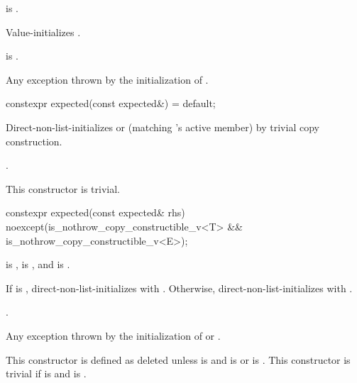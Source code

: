 \begin{itemdescr}
\pnum
\constraints
{} is .

\pnum
\effects
Value-initializes .

\pnum
\ensures
{} is .

\pnum
\throws
Any exception thrown by the initialization of .
\end{itemdescr}

%
\begin{itemdecl}
constexpr expected(const expected&) = default;
\end{itemdecl}

\begin{itemdescr}
\pnum
\effects
Direct-non-list-initializes  or  (matching 's active member) by trivial copy construction.

\pnum
\ensures
{}.

\pnum
\remarks
This constructor is trivial.
\end{itemdescr}

%
\begin{itemdecl}
constexpr expected(const expected& rhs) noexcept(is_nothrow_copy_constructible_v<T> &&
                                                 is_nothrow_copy_constructible_v<E>);
\end{itemdecl}

\begin{itemdescr}
\pnum
\constraints
{} is ,  is , and  is .

\pnum
\effects
If  is , direct-non-list-initializes  with . Otherwise, direct-non-list-initializes  with .

\pnum
\ensures
{}.

\pnum
\throws
Any exception thrown by the initialization of  or .

\pnum
\remarks
This constructor is defined as deleted unless  is  and  is  or  is . This constructor is trivial if  is  and  is .
\end{itemdescr}

